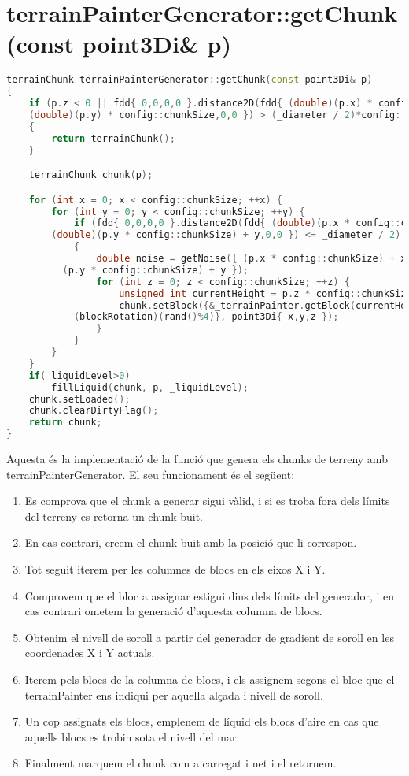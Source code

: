 \section{terrainPainterGenerator::getChunk(const point3Di& p)}
\begin{lstlisting}[language=C++]
terrainChunk terrainPainterGenerator::getChunk(const point3Di& p)
{
	if (p.z < 0 || fdd{ 0,0,0,0 }.distance2D(fdd{ (double)(p.x) * config::chunkSize,
    (double)(p.y) * config::chunkSize,0,0 }) > (_diameter / 2)*config::chunkSize)
	{
		return terrainChunk();
	}

	terrainChunk chunk(p);

	for (int x = 0; x < config::chunkSize; ++x) {
		for (int y = 0; y < config::chunkSize; ++y) {
			if (fdd{ 0,0,0,0 }.distance2D(fdd{ (double)(p.x * config::chunkSize) + x,
        (double)(p.y * config::chunkSize) + y,0,0 }) <= _diameter / 2)
			{
				double noise = getNoise({ (p.x * config::chunkSize) + x,
          (p.y * config::chunkSize) + y });
				for (int z = 0; z < config::chunkSize; ++z) {
					unsigned int currentHeight = p.z * config::chunkSize + z;
					chunk.setBlock({&_terrainPainter.getBlock(currentHeight, noise),
            (blockRotation)(rand()%4)}, point3Di{ x,y,z });
				}
			}
		}
	}
	if(_liquidLevel>0)
		fillLiquid(chunk, p, _liquidLevel);
	chunk.setLoaded();
	chunk.clearDirtyFlag();
	return chunk;
}
\end{lstlisting}
Aquesta és la implementació de la funció que genera els chunks de terreny amb terrainPainterGenerator.
El seu funcionament és el següent:
\begin{enumerate}
  \item Es comprova que el chunk a generar sigui vàlid, i si es troba fora dels límits del terreny es retorna un chunk buit.
  \item En cas contrari, creem el chunk buit amb la posició que li correspon.
  \item Tot seguit iterem per les columnes de blocs en els eixos X i Y.
  \item Comprovem que el bloc a assignar estigui dins dels límits del generador, i en cas contrari ometem la generació d'aquesta columna de blocs.
  \item Obtenim el nivell de soroll a partir del generador de gradient de soroll en les coordenades X i Y actuals.
  \item Iterem pels blocs de la columna de blocs, i els assignem segons el bloc que el terrainPainter ens indiqui per aquella alçada i nivell de soroll.
  \item Un cop assignats els blocs, emplenem de líquid els blocs d'aire en cas que aquells blocs es trobin sota el nivell del mar.
  \item Finalment marquem el chunk com a carregat i net i el retornem.
\end{enumerate}
